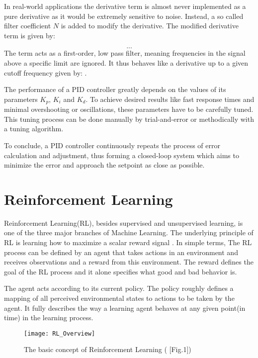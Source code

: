 In real-world applications the derivative term is almost never implemented as a pure derivative as it would be extremely sensitive to noise.
Instead, a so called filter coefficient $N$ is added to modify the derivative.
The modified derivative term is given by:

\[
...
\]
The term acts as a first-order, low pass filter, meaning frequencies in the signal above a specific limit are ignored.
It thus behaves like a derivative up to a given cutoff frequency given by: .

The performance of a PID controller greatly depends on the values of its parameters $K_p$, $K_i$ and $K_d$.
To achieve desired results like fast response times and minimal overshooting or oscillations, these parameters have to be carefully tuned. 
This tuning process can be done manually by trial-and-error or methodically with a tuning algorithm.

To conclude, a PID controller continuously repeats the process of error calculation and adjustment, thus forming a closed-loop system which aims to minimize the error and approach the setpoint as close as possible.





\section{Reinforcement Learning}

Reinforcement Learning(RL), besides supervised and unsupervised learning, is one of the three major branches of Machine Learning.
The underlying principle of RL is learning how to maximize a scalar reward signal \parencite{sutton2018reinforcement}.
In simple terms, The RL process can be defined by an agent that takes actions in an environment and receives observations and a reward from this environment.
The reward defines the goal of the RL process and it alone specifies what good and bad behavior is. 

The agent acts according to its current policy.
The policy roughly defines a mapping of all perceived environmental states to actions to be taken by the agent.
It fully  describes the way a learning agent behaves at any given point(in time) in the learning process.\parencite{sutton2018reinforcement} \parencite{D. Silver Lec. 2}

\begin{figure}[h]
	\centerline{\texttt{[image: RL\_Overview]}}
	\caption{The basic concept of Reinforcement Learning (\cite{weng2018bandit} [Fig.1])}
	\label{figure: RL Illustration}
\end{figure}

